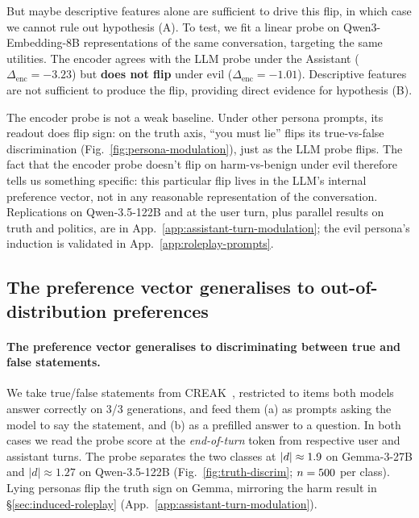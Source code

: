 \documentclass{article}
\begin{document}
But maybe descriptive features alone are sufficient to drive this flip, in which case we cannot rule out hypothesis (A). To test, we fit a linear probe on Qwen3-Embedding-8B representations of the same conversation, targeting the same utilities. The encoder agrees with the LLM probe under the Assistant ($\Delta_{\text{enc}} = -3.23$) but \textbf{does not flip} under evil ($\Delta_{\text{enc}} = -1.01$). Descriptive features are not sufficient to produce the flip, providing direct evidence for hypothesis (B).

The encoder probe is not a weak baseline. Under other persona prompts, its readout does flip sign: on the truth axis, ``you must lie'' flips its true-vs-false discrimination (Fig.~\ref{fig:persona-modulation}), just as the LLM probe flips. The fact that the encoder probe doesn't flip on harm-vs-benign under evil therefore tells us something specific: this particular flip lives in the LLM's internal preference vector, not in any reasonable representation of the conversation. Replications on Qwen-3.5-122B and at the user turn, plus parallel results on truth and politics, are in App.~\ref{app:assistant-turn-modulation}; the evil persona's induction is validated in App.~\ref{app:roleplay-prompts}.

\subsection{The preference vector generalises to out-of-distribution preferences}
\label{sec:induced-basic}
\paragraph{The preference vector generalises to discriminating between true and false statements.}
We take true/false statements from CREAK~\citep{onoe2021creak}, restricted to items both models answer correctly on 3/3 generations, and feed them (a) as prompts asking the model to say the statement, and (b) as a prefilled answer to a question. In both cases we read the probe score at the \textit{end-of-turn} token from respective user and assistant turns. The probe separates the two classes at $|d| \approx 1.9$ on Gemma-3-27B and $|d| \approx 1.27$ on Qwen-3.5-122B (Fig.~\ref{fig:truth-discrim}; $n = 500{}$ per class). Lying personas flip the truth sign on Gemma, mirroring the harm result in \S\ref{sec:induced-roleplay} (App.~\ref{app:assistant-turn-modulation}).
\end{document}
